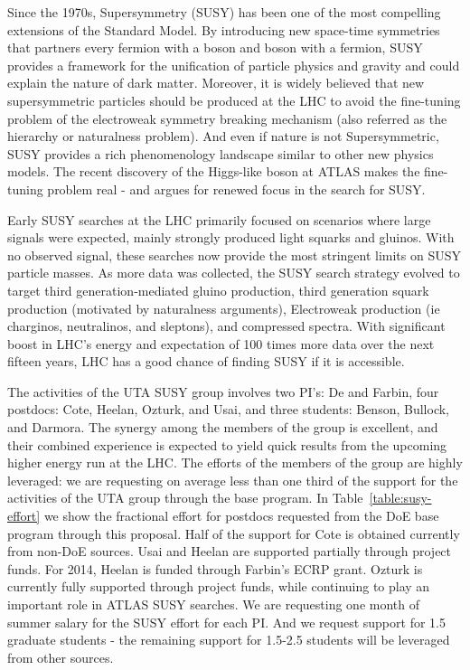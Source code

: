 \label{sec:susy}
Since the 1970s, Supersymmetry (SUSY) has been one of the most
compelling extensions of the Standard Model. By introducing new
space-time symmetries that partners every fermion with a boson and
boson with a fermion, SUSY provides a framework for the unification of
particle physics and gravity and could explain the nature of dark
matter. Moreover, it is widely believed that new supersymmetric
particles should be produced at the LHC to avoid the fine-tuning
problem of the electroweak symmetry breaking mechanism (also referred
as the hierarchy or naturalness problem). And even if nature is not
Supersymmetric, SUSY provides a rich phenomenology landscape similar to
other new physics models. The recent discovery of the Higgs-like boson at 
ATLAS makes the fine-tuning problem real - and argues for renewed focus 
in the search for SUSY.

Early SUSY searches at the LHC primarily focused on scenarios where
large signals were expected, mainly strongly produced light squarks
and gluinos. With no observed signal, these searches now provide the
most stringent limits on SUSY particle masses. As more data was
collected, the SUSY search strategy evolved to target third
generation-mediated gluino production, third generation squark
production (motivated by naturalness arguments), Electroweak
production (ie charginos, neutralinos, and sleptons), and compressed
spectra. With significant boost in LHC's energy and expectation of 100
times more data over the next fifteen years, LHC has a good chance of
finding SUSY if it is accessible.

The activities of the UTA SUSY group involves two PI's: De and Farbin,
four postdocs: Cote, Heelan, Ozturk, and Usai, and three students:
Benson, Bullock, and Darmora. The synergy among the members of the
group is excellent, and their combined experience is expected to yield
quick results from the upcoming higher energy run at the LHC. The
efforts of the members of the group are highly leveraged: we are
requesting on average less than one third of the support for the
activities of the UTA group through the base program. In
Table~\ref{table:susy-effort} we show the fractional effort for
postdocs requested from the DoE base program through this
proposal. Half of the support for Cote is obtained currently from
non-DoE sources. Usai and Heelan are supported partially through
project funds. For 2014, Heelan is funded through Farbin's ECRP
grant. Ozturk is currently fully supported through project funds,
while continuing to play an important role in ATLAS SUSY searches. We
are requesting one month of summer salary for the SUSY effort for each
PI. And we request support for 1.5 graduate students - the remaining
support for 1.5-2.5 students will be leveraged from other sources.

